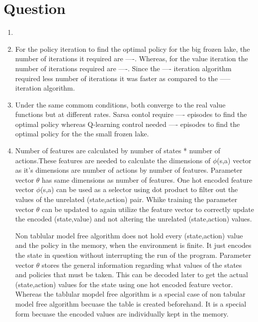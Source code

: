 \documentclass[11pt]{article}
\begin{document}
\section {Question}
	\begin{enumerate}
		\item 
		
		\item For the policy iteration to find the optimal policy for the big frozen lake, the number of iterations it required are ----. Whereas, for the value iteration the number of iterations required are ----. Since the ---- iteration algorithm required less number of iterations it was faster as compared to the  ----- iteration algorithm.
		
		\item Under the same commom conditions, both converge to the real value functions but at different rates. Sarsa contol require ---- episodes to find the optimal policy whereas Q-learning control needed ---- episodes to find the optimal policy for the the small frozen lake. 
		
		\item Number of features are calculated by number of states * number of actions.These features are needed to calculate the dimensions of $\phi$(s,a) vector as it's dimensions are number of actions by number of features. Parameter vector $\theta$ has same dimensions as number of features. One hot encoded feature vector $\phi$(s,a) can be used as a selector using dot product to filter out the values of the unrelated (state,action) pair. Whike training the parameter vector $\theta$ can be updated to again utilize the feature vector to correctly update the encoded (state,value) and not altering the unrelated (state,action) values. \par
		
		Non tablular model free algorithm does not hold every (state,action) value and the policy in the memory, when the environment is finite. It just encodes the state in question without interrupting the run of the program. Parameter vector $\theta$ stores the general information regarding what values of the states and policies that must be taken. This can be decoded later to get the actual (state,action) values for the state using one hot encoded feature vector. Whereas the tablular mopdel free algorithm is a special case of non tabular model free algorithm becuase the table is created beforehand. It is a special form becuase the encoded values are individually kept in the memory.
		

\end{enumerate}
\end{document}
